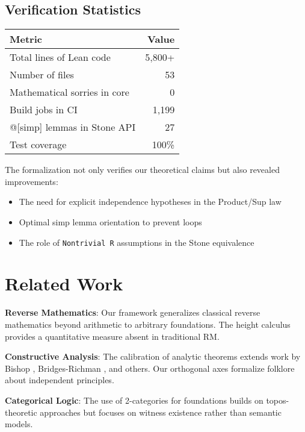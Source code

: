 \documentclass[11pt]{article}
\begin{document}
\subsection{Verification Statistics}

\begin{center}
\begin{tabular}{|l|r|}
\hline
\textbf{Metric} & \textbf{Value} \\
\hline
Total lines of Lean code & 5,800+ \\
Number of files & 53 \\
Mathematical sorries in core & 0 \\
Build jobs in CI & 1,199 \\
@[simp] lemmas in Stone API & 27 \\
Test coverage & 100\% \\
\hline
\end{tabular}
\end{center}

The formalization not only verifies our theoretical claims but also revealed improvements:
\begin{itemize}
\item The need for explicit independence hypotheses in the Product/Sup law
\item Optimal simp lemma orientation to prevent loops
\item The role of \texttt{Nontrivial R} assumptions in the Stone equivalence
\end{itemize}

\section{Related Work}

\textbf{Reverse Mathematics}: Our framework generalizes classical reverse mathematics \cite{Simpson} beyond arithmetic to arbitrary foundations. The height calculus provides a quantitative measure absent in traditional RM.

\textbf{Constructive Analysis}: The calibration of analytic theorems extends work by Bishop \cite{Bishop}, Bridges-Richman \cite{BR}, and others. Our orthogonal axes formalize folklore about independent principles.

\textbf{Categorical Logic}: The use of 2-categories for foundations builds on topos-theoretic approaches \cite{Johnstone} but focuses on witness existence rather than semantic models.
\end{document}
